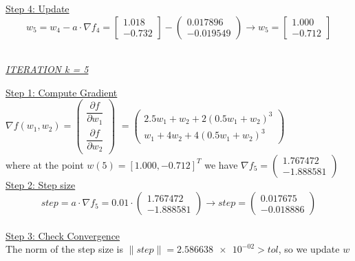 \underline{Step 4: Update}
\[ 
w_5 = w_4 - a\cdot \nabla f_4 =  \left[\begin{array}{c}
	1.018\\
	-0.732
\end{array}\right] - \left(\begin{array}{c}
	0.017896 \\
-0.019549
\end{array}\right) \rightarrow
w_5 = \left[\begin{array}{c}
	1.000\\
	-0.712
\end{array}\right]
\]
\\[4mm]

\begin{center}
	\underline{\textit{ITERATION k = 5}}
\end{center}

\underline{Step 1: Compute Gradient}\\
\(\nabla f(w_1,w_2) = \left(\begin{array}{c}
	\dfrac{\partial f}{\partial w_1} \\[4mm]
	\dfrac{\partial f}{\partial w_2}
\end{array}\right)\) $= \left(\begin{array}{c}
	2.5w_1 + w_2 + 2(0.5w_1+w_2)^3\\[1mm]
	w_1 + 4w_2 + 4(0.5w_1+w_2)^3
\end{array}\right)$ \\[3mm]

where at the point $w\left(5\right) = \left[1.000, -0.712\right]^T$ we have $\nabla f_{5} = \left(\begin{array}{c}
	1.767472 \\
	-1.888581
\end{array}\right)$
\\[4mm]

\underline{Step 2: Step size}
\[
step = a \cdot \nabla f_{5} = 0.01 \cdot \left(\begin{array}{c}
	1.767472 \\
-1.888581
\end{array}\right) \rightarrow step =\left(\begin{array}{c}
0.017675 \\
-0.018886
\end{array}\right)
\]
\\[4mm]

\underline{Step 3: Check Convergence}\\
The norm of the step size is $\| step \| = \num{2.586638e-02} > tol$, so we update $w$
\\[4mm]

